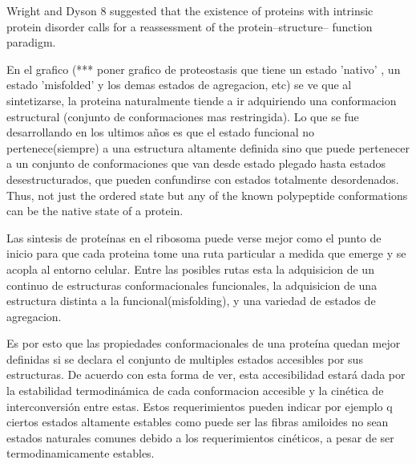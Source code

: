 Wright and Dyson 8 suggested that the existence of proteins with intrinsic protein disorder calls for a reassessment of the protein–structure– function paradigm.




En el grafico (*** poner grafico de proteostasis que tiene un estado 'nativo' , un estado 'misfolded' y los demas estados de agregacion, etc) se ve que al sintetizarse, 
la proteina naturalmente tiende a ir adquiriendo una conformacion estructural (conjunto de conformaciones mas restringida).
Lo que se fue desarrollando en los ultimos años es que el estado funcional no pertenece(siempre) a una estructura altamente definida sino que puede pertenecer a un conjunto de conformaciones que van desde
estado plegado hasta estados desestructurados, que pueden confundirse con estados totalmente desordenados. 
Thus, not just the ordered state but any of the known polypeptide conformations can be the native state of a protein.

Las sintesis de proteínas en el ribosoma puede verse mejor como el punto de inicio para que cada proteina tome una ruta particular a medida que emerge y se acopla al entorno celular. 
Entre las posibles rutas esta la adquisicion de un continuo de estructuras conformacionales funcionales, la adquisicion de una estructura distinta a la funcional(misfolding), y una variedad de estados de agregacion.


Es por esto que las propiedades conformacionales de una proteína quedan mejor definidas si se declara el conjunto de multiples estados accesibles por sus estructuras.
De acuerdo con esta forma de ver, esta accesibilidad estará dada por la estabilidad termodinámica de cada conformacion accesible y la cinética de interconversión entre estas.
Estos requerimientos pueden indicar por ejemplo q ciertos estados altamente estables como puede ser las fibras amiloides no sean estados naturales comunes debido a los requerimientos cinéticos, a pesar de ser termodinamicamente estables.

